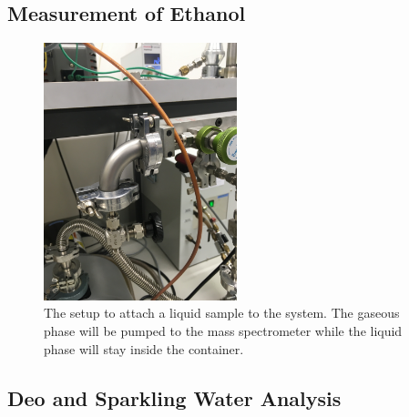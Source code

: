     
    \subsection{Measurement of Ethanol}
    
    \begin{figure}[h!]
    \centering
    \includegraphics[angle=-90, origin=c, width=0.5\textwidth]{Report/pictures/liquids.JPG}
    \caption{The setup to attach a liquid sample to the system. The gaseous phase will be pumped to the mass spectrometer while the liquid phase will stay inside the container.}
    \label{fig:ethanol}
    \end{figure}
    
    \subsection{Deo and Sparkling Water Analysis}
    

